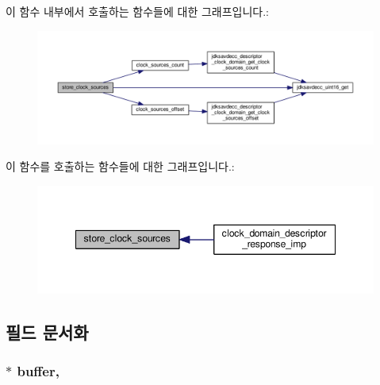 이 함수 내부에서 호출하는 함수들에 대한 그래프입니다.\+:
\nopagebreak
\begin{figure}[H]
\begin{center}
\leavevmode
\includegraphics[width=350pt]{classavdecc__lib_1_1clock__domain__descriptor__response__imp_a851d798983a63886ac76411eda83a7a0_cgraph}
\end{center}
\end{figure}




이 함수를 호출하는 함수들에 대한 그래프입니다.\+:
\nopagebreak
\begin{figure}[H]
\begin{center}
\leavevmode
\includegraphics[width=348pt]{classavdecc__lib_1_1clock__domain__descriptor__response__imp_a851d798983a63886ac76411eda83a7a0_icgraph}
\end{center}
\end{figure}




\subsection{필드 문서화}
\subsubsection[{\texorpdfstring{buffer}{buffer}}]{$\ast$ buffer\hspace{0.3cm}{\ttfamily [protected]}, {\ttfamily [inherited]}}\hypertarget{classavdecc__lib_1_1descriptor__response__base__imp_a56ed84df35de10bdb65e72b184309497}{}\label{classavdecc__lib_1_1descriptor__response__base__imp_a56ed84df35de10bdb65e72b184309497}


